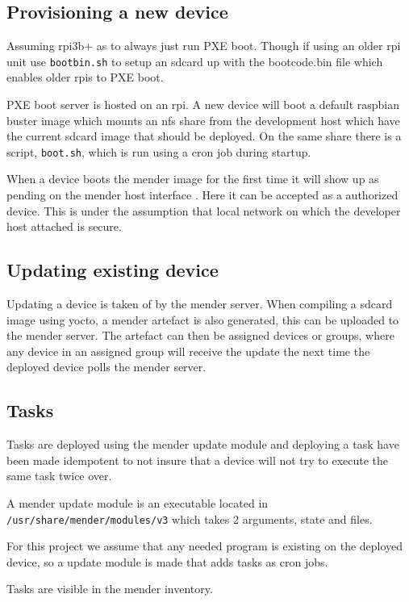 \documentclass[../../main.tex]{subfiles}
\begin{document}
\subsection{Provisioning a new device}%
\label{sub:provisioning_a_new_device}
Assuming rpi3b+ as to always just run PXE boot. Though if using an older rpi unit use 
\texttt{bootbin.sh} to setup an sdcard up with the bootcode.bin file which
enables older rpis to PXE boot.

PXE boot server is hosted on an rpi. A new device will boot a default raspbian buster image
which mounts an nfs share from the development host which have the current sdcard image that 
should be deployed. On the same share there is a script, \texttt{boot.sh}, which is
run using a cron job during startup.\\


When a device boots the mender image for the first time it will show up as pending on the mender
host interface . Here it can be accepted as a authorized device.
This is under the assumption that local network on which the developer host attached is secure.


\subsection{Updating existing device}%
\label{sub:updating_existing_device}

Updating a device is taken of by the mender server. When compiling a sdcard image using yocto,
a mender artefact is also generated, this can be uploaded to the mender server.
The artefact can then be assigned devices or groups, where any device in an assigned group will
receive the update the next time the deployed device polls the mender server.



\subsection{Tasks}%
\label{sub:tasks}

Tasks are deployed using the mender update module and deploying a task have been made idempotent
to not insure that a device will not try to execute the same task twice over.

A mender update module is an executable located in \texttt{/usr/share/mender/modules/v3}
which takes 2 arguments, state and files.

For this project we assume that any needed program is existing on the deployed device,
so a update module is made that adds tasks as cron jobs.

Tasks are visible in the mender inventory.
\end{document}
